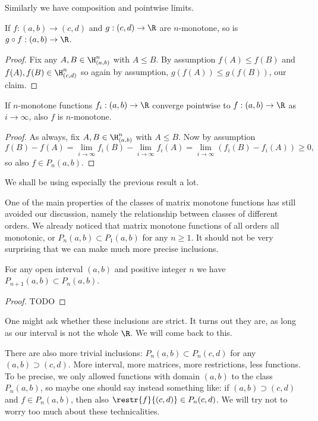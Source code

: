 Similarly we have composition and pointwise limits.

\begin{prop}
	If $f : (a, b) \to (c, d)$ and $g : (c, d) \to \R$ are $n$-monotone, so is $g \circ f : (a, b) \to \R$.
\end{prop}
\begin{proof}
	Fix any $A, B \in \H^{n}_{(a, b)}$ with $A \leq B$. By assumption $f(A) \leq f(B)$ and $f(A), f(B) \in \H^{n}_{(c, d)}$ so again by assumption, $g(f(A)) \leq g(f(B))$, our claim.
\end{proof}

\begin{prop}
	If $n$-monotone functions $f_{i} : (a, b) \to \R$ converge pointwise to $f : (a, b) \to \R$ as $i \to \infty$, also $f$ is $n$-monotone.
\end{prop}
\begin{proof}
	As always, fix $A, B \in \H^{n}_{(a, b)}$ with $A \leq B$. Now by assumption
	\[
		f(B) - f(A) = \lim_{i \to \infty} f_{i}(B) - \lim_{i \to \infty} f_{i}(A) = \lim_{i \to \infty} \left(f_{i}(B) - f_{i}(A)\right) \geq 0,
	\]
	so also $f \in P_{n}(a, b)$.
\end{proof}

We shall be using especially the previous result a lot.

One of the main properties of the classes of matrix monotone functions has still avoided our discussion, namely the relationship between classes of different orders. We already noticed that matrix monotone functions of all orders all monotonic, or $P_{n}(a,b) \subset P_{1}(a, b)$ for any $n \geq 1$. It should not be very surprising that we can make much more precise inclusions.

\begin{prop}
	For any open interval $(a, b)$ and positive integer $n$ we have $P_{n + 1}(a, b) \subset P_{n}(a, b)$.
\end{prop}
\begin{proof}
	TODO
\end{proof}

One might ask whether these inclusions are strict. It turns out they are, as long as our interval is not the whole $\R$. We will come back to this.

There are also more trivial inclusions: $P_{n}(a, b) \subset P_{n}(c, d)$ for any $(a, b) \supset (c, d)$. More interval, more matrices, more restrictions, less functions. To be precise, we only allowed functions with domain $(a, b)$ to the class $P_{n}(a, b)$, so maybe one should say instead something like: if $(a, b) \supset (c, d)$ and $f \in P_{n}(a, b)$, then also $\restr{f}{(c, d)} \in P_{n}(c, d)$. We will try not to worry too much about these technicalities.

